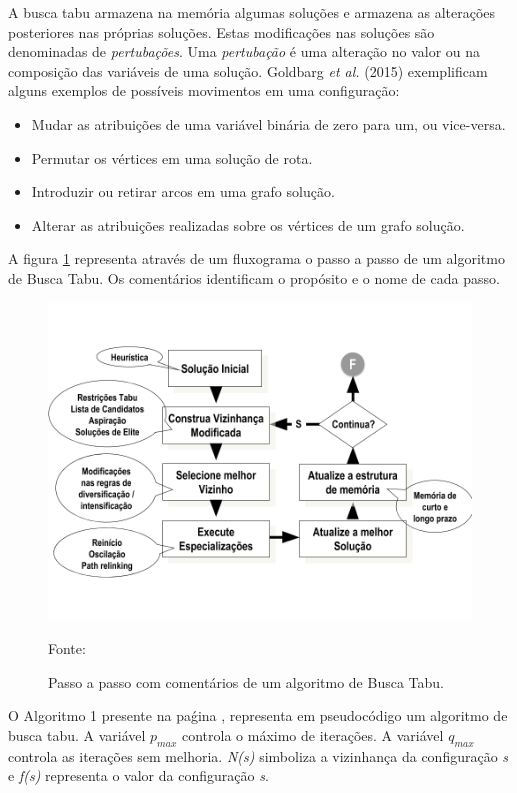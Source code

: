 A busca tabu armazena na memória algumas soluções e armazena as alterações posteriores nas próprias soluções. Estas modificações nas soluções são denominadas de \emph{pertubações}. Uma \emph{pertubação} é uma alteração no valor ou na composição das variáveis de uma solução. Goldbarg \emph{et al.} (2015) exemplificam alguns exemplos de possíveis movimentos em uma configuração:

\begin{itemize}
    \item Mudar as atribuições de uma variável binária de zero para um, ou vice-versa.
    \item Permutar os vértices em uma solução de rota.
    \item Introduzir ou retirar arcos em uma grafo solução.
    \item Alterar as atribuições realizadas sobre os vértices de um grafo solução.
\end{itemize}

A figura \ref{taboo-image} representa através de um fluxograma o passo a passo de um algoritmo de Busca Tabu. Os comentários identificam o propósito e o nome de cada passo. 


\begin{figure}[H]
  \centering
  \caption{Passo a passo com comentários de um algoritmo de Busca Tabu.}
 \includegraphics[scale=0.4]{imagens/tabu.png} \par
\bigskip
    Fonte: \cite[p. 97]{goldbarg}
    \label{taboo-image}
\end{figure}

O Algoritmo 1 presente na paǵina \pageref{pseudocodigo-busca-tabu}, representa em pseudocódigo um algoritmo de busca tabu. A variável $p_{max}$ controla o máximo de iterações. A variável $q_{max}$ controla as iterações sem melhoria. \emph{N(s)} simboliza a vizinhança da configuração \emph{s} e \emph{f(s)} representa o valor da configuração \emph{s}.

